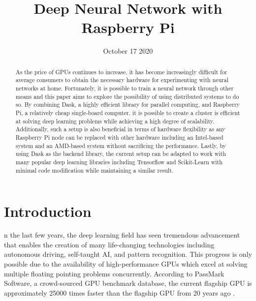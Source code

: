 \documentclass[conference]{IEEEtran}
\begin{document}
    \title{Deep Neural Network with Raspberry Pi}
    \author{
        \and
    }
    \date{October 17 2020}
    \maketitle

    \begin{abstract}
        As the price of GPUs continues to increase, it has become increasingly difficult for average consumers to obtain the necessary hardware for experimenting with neural networks at home. Fortunately, it is possible to train a neural network through other means and this paper aims to explore the possibility of using distributed systems to do so. By combining Dask, a highly efficient library for parallel computing, and Raspberry Pi, a relatively cheap single-board computer, it is possible to create a cluster is efficient at solving deep learning problems while achieving a high degree of scalability. Additionally, such a setup is also beneficial in terms of hardware flexibility as any Raspberry Pi node can be replaced with other hardware including an Intel-based system and an AMD-based system without sacrificing the performance. Lastly, by using Dask as the backend library, the current setup can be adapted to work with many popular deep learning libraries including Tensorflow and Scikit-Learn with minimal code modification while maintaining a similar result.
        \end{abstract}

    \section{Introduction}
        n the last few years, the deep learning field has seen tremendous advancement that enables the creation of many life-changing technologies including autonomous driving, self-taught AI, and pattern recognition. This progress is only possible due to the availability of high-performance GPUs which excel at solving multiple floating pointing problems concurrently.
        According to PassMark Software, a crowd-sourced GPU benchmark database, the current flagship GPU is approximately 25000 times faster than the flagship GPU from 20 years ago \cite{passmark_software}. 
\end{document}
